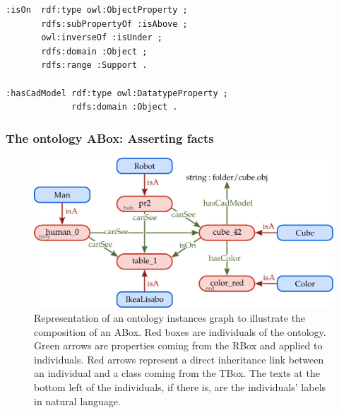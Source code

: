 \begin{lstlisting}[frame=single, basicstyle=\scriptsize\ttfamily, label={lst:Rbox}, caption={Description of ontology properties in the OWL language using the Turle syntax.},captionpos=b, style=OwlTurtle]
:isOn  rdf:type owl:ObjectProperty ;
       rdfs:subPropertyOf :isAbove ;
       owl:inverseOf :isUnder ;
       rdfs:domain :Object ;
       rdfs:range :Support .

:hasCadModel rdf:type owl:DatatypeProperty ;
             rdfs:domain :Object .
\end{lstlisting}

\subsubsection{The ontology ABox: Asserting facts}

\begin{figure}[ht!]
\centering
\includegraphics[scale=0.4]{figures/chapter2/Abox.png}
\caption{\label{fig:Abox}  Representation of an ontology instances graph to illustrate the composition of an ABox. Red boxes are individuals of the ontology. Green arrows are properties coming from the RBox and applied to individuals. Red arrows represent a direct inheritance link between an individual and a class coming from the TBox. The texts at the bottom left of the individuals, if there is, are the individuals' labels in natural language.}
\end{figure}


